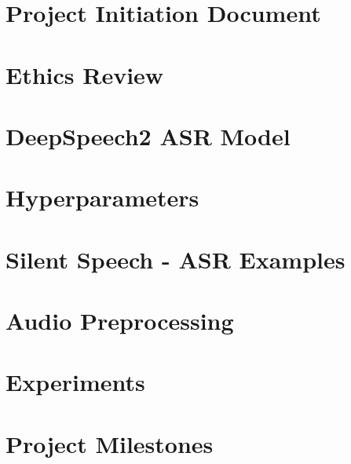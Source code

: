 \appendix


\chapter{Project Initiation Document}




\chapter{Ethics Review}



\chapter{DeepSpeech2 ASR Model}



\chapter{Hyperparameters}



\chapter{Silent Speech - ASR Examples}



\chapter{Audio Preprocessing}



\chapter{Experiments}



\chapter{Project Milestones}

